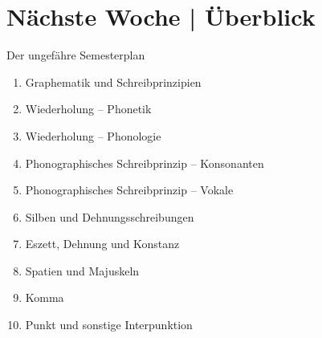 \ifdefined\TITLE
  \section{Nächste Woche | Überblick}

  \begin{frame}
    {Der ungefähre Semesterplan}
    \begin{enumerate}[<+->]
      \item Graphematik und Schreibprinzipien
      \item \alert{Wiederholung -- Phonetik}
      \item Wiederholung -- Phonologie
      \item Phonographisches Schreibprinzip -- Konsonanten
      \item Phonographisches Schreibprinzip -- Vokale
      \item Silben und Dehnungsschreibungen
      \item Eszett, Dehnung und Konstanz
      \item Spatien und Majuskeln
      \item Komma
      \item Punkt und sonstige Interpunktion
    \end{enumerate}
  \end{frame}
\fi
